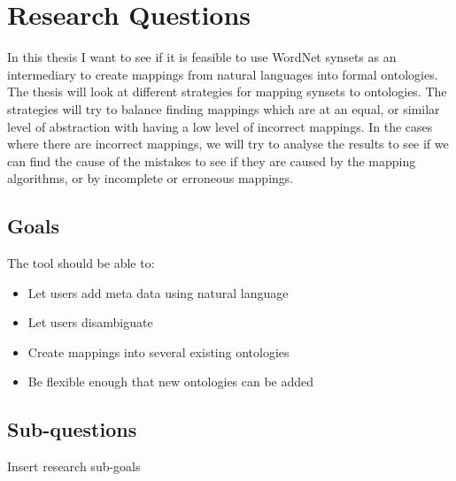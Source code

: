
\section{Research Questions}
In this thesis I want to see if it is feasible to use WordNet synsets as an intermediary 
to create mappings from natural languages into formal ontologies.
The thesis will look at different strategies for mapping synsets to ontologies. 
The strategies will try to balance finding mappings which are at an equal, 
or similar level of abstraction with having a low level of incorrect mappings.
In the cases where there are incorrect mappings, 
we will try to analyse the results to see if we can find the cause of the mistakes to see if they are caused by the 
mapping algorithms, or by incomplete or erroneous mappings.
\subsection{Goals}
The tool should be able to:
\begin{itemize}
	\item Let users add meta data using natural language
	\item Let users disambiguate
	\item Create mappings into several existing ontologies
	\item Be flexible enough that new ontologies can be added
\end{itemize}

\subsection{Sub-questions}
Insert research sub-goals
